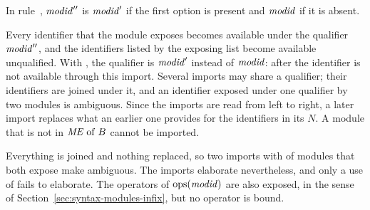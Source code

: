 
In rule~, $\mathit{modid}''$ is $\mathit{modid}'$ if the first
option is present and $\mathit{modid}$ if it is absent.



\begin{rulecomments}
 Every identifier that the module exposes becomes
available under the qualifier $\mathit{modid}''$, and the identifiers listed by the
exposing list become available unqualified. With , the qualifier is
$\mathit{modid}'$ instead of $\mathit{modid}$: after  the identifier
 is not available through this import. Several imports may
share a qualifier; their identifiers are joined under it, and an identifier
exposed under one qualifier by two modules is ambiguous. Since the imports are
read from left to right, a later import replaces what an earlier one provides
for the identifiers in its $N$. A module that is not in $\mathit{ME} \mathrel{\mathrm{of}} B$ cannot be
imported.
\end{rulecomments}




\begin{rulecomments}
 Everything is joined and nothing replaced, so two
imports with  of modules that both expose  make
 ambiguous. The imports elaborate nevertheless, and only a use of
 fails to elaborate. %
The operators of $\mathrm{ops}(\mathit{modid})$ are also exposed, in the sense of
Section~\ref{sec:syntax-modules-infix}, but no operator is bound.
\end{rulecomments}

